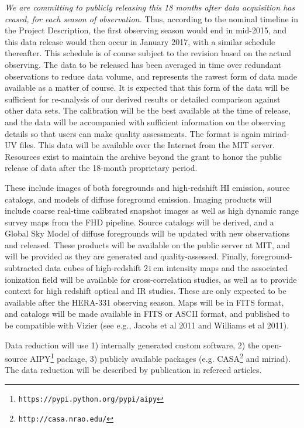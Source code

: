 \documentclass[preprint]{aastex}
\begin{document}
  {\it We are committing to publicly releasing this 18 months after data acquisition has ceased, for each season of observation.}      
Thus, according to the nominal timeline in the Project Description, the first observing season would end in mid-2015, and this data release would then occur in January 2017, with a similar schedule thereafter.  This schedule is of course subject to the revision based on the actual observing.  The data to be released has been averaged in time over redundant observations to reduce data volume, and represents the rawest form of data made available as a matter of course.  It is expected that this form of the data will be sufficient for re-analysis of our derived results or detailed comparison against other data sets.  The calibration will be the best available at the time of release, and the data will be accompanied with sufficient information on the observing details so that users can make quality assessments.  The format is again {\sc miriad}-UV files.   This data will be available over the Internet from the MIT server.  Resources exist to maintain the archive beyond the grant to honor the  public release of data after the 18-month proprietary period.
 
  These include images of both foregrounds and high-redshift HI emission, source catalogs, and models of diffuse foreground emission.  Imaging products will include coarse real-time calibrated snapshot images as well as high dynamic range survey maps from the FHD pipeline.  Source catalogs will be derived, and a Global Sky Model of diffuse foregrounds will be updated with new observations and released.  These products will be available on the public server at MIT, and will be provided as they are generated and quality-assessed.  Finally, foreground-subtracted data cubes of high-redshift $21\,\textrm{cm}$ intensity maps and the associated ionization field will be available for cross-correlation studies, as well as to provide context for high redshift optical and IR studies.  These are only expected to be available after the HERA-331 observing season.  Maps will be in FITS format, and catalogs will be made available in FITS or ASCII format, and published to be compatible with Vizier (see e.g., Jacobs et al 2011 and Williams et al 2011).  

  Data reduction will use 1) internally generated custom software, 2) the open-source AIPY\footnote{\tt https://pypi.python.org/pypi/aipy} package, 3) publicly available packages (e.g. CASA\footnote{ \tt http://casa.nrao.edu/} and {\sc miriad}).  The data reduction will be described by publication in refereed articles.  
\end{document}
